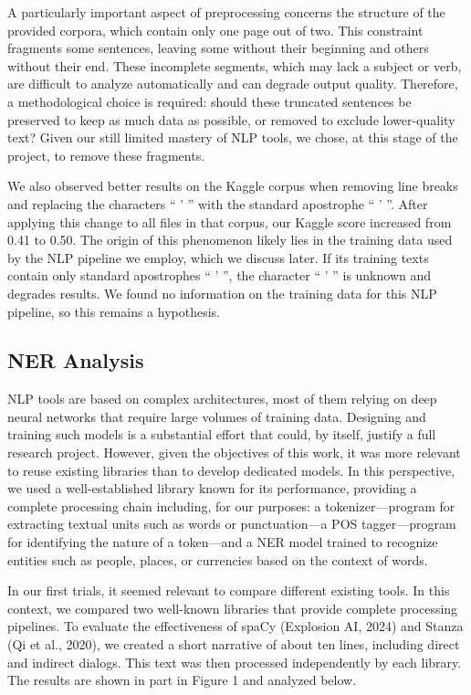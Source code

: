 \documentclass[a4paper]{article}
\begin{document}
A particularly important aspect of preprocessing concerns the structure of the provided corpora, which contain only one page out of two. This constraint fragments some sentences, leaving some without their beginning and others without their end. These incomplete segments, which may lack a subject or verb, are difficult to analyze automatically and can degrade output quality. Therefore, a methodological choice is required: should these truncated sentences be preserved to keep as much data as possible, or removed to exclude lower-quality text? Given our still limited mastery of NLP tools, we chose, at this stage of the project, to remove these fragments.

We also observed better results on the Kaggle corpus when removing line breaks and replacing the characters “ ’ ” with the standard apostrophe “ ' ”. After applying this change to all files in that corpus, our Kaggle score increased from 0.41 to 0.50. The origin of this phenomenon likely lies in the training data used by the NLP pipeline we employ, which we discuss later. If its training texts contain only standard apostrophes “ ' ”, the character “ ’ ” is unknown and degrades results. We found no information on the training data for this NLP pipeline, so this remains a hypothesis.

\subsection{NER Analysis}

NLP tools are based on complex architectures, most of them relying on deep neural networks that require large volumes of training data. Designing and training such models is a substantial effort that could, by itself, justify a full research project. However, given the objectives of this work, it was more relevant to reuse existing libraries than to develop dedicated models. In this perspective, we used a well-established library known for its performance, providing a complete processing chain including, for our purposes: a tokenizer—program for extracting textual units such as words or punctuation—a POS tagger—program for identifying the nature of a token—and a NER model trained to recognize entities such as people, places, or currencies based on the context of words.

In our first trials, it seemed relevant to compare different existing tools. In this context, we compared two well-known libraries that provide complete processing pipelines. To evaluate the effectiveness of spaCy (Explosion AI, 2024) and Stanza (Qi et al., 2020), we created a short narrative of about ten lines, including direct and indirect dialogs. This text was then processed independently by each library. The results are shown in part in Figure 1 and analyzed below.
\end{document}
